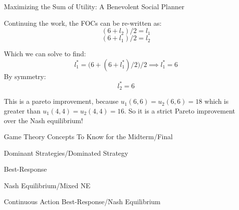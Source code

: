 \documentclass[aspectratio=169]{beamer}
\newenvironment{wideitemize}{\itemize\addtolength{\itemsep}{10pt}}{\enditemize}
\begin{document}
\begin{frame}{Maximizing the Sum of Utility: A Benevolent Social Planner}

Continuing the work, the FOCs can be re-written as:
\[(6 + l_2)/2 =l_1 \]
\[(6 + l_1)/2 =l_2 \]

Which we can solve to find:
\[l_1^* = \bigg ( 6 + (6 + l_1^*)/2 \bigg )/2 \implies l_1^* = 6\]
By symmetry:
\[l_2^* = 6\]

This is a pareto improvement, because $u_1(6,6) = u_2(6,6)=18$ which is greater than $u_1(4,4) = u_2(4,4)=16$. So it is a strict Pareto improvement over the Nash equilibrium!


\end{frame}
\begin{frame}{Game Theory Concepts To Know for the Midterm/Final}

\begin{wideitemize}
    \item Dominant Strategies/Dominated Strategy
    \item Best-Response
    \item Nash Equilibrium/Mixed NE
    \item Continuous Action Best-Response/Nash Equilibrium
\end{wideitemize}
    
\end{frame}
\end{document}
